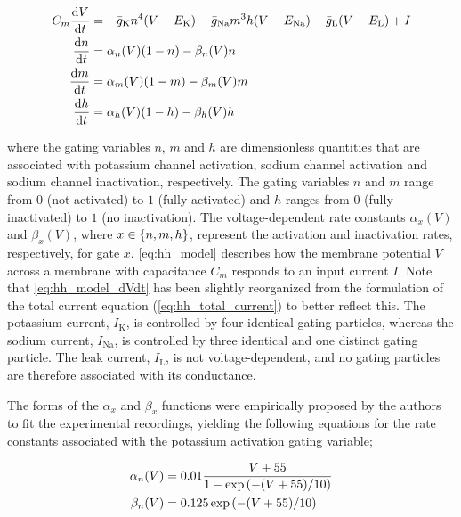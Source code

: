 \begin{subequations}\label{eq:hh_model}
    \begin{align}
    C_m \frac{\dd{V}}{\dd{t}} &= - \bar{g}_{\mathrm{K}} n^4 \qty(V - E_\mathrm{K}) - \bar{g}_{\mathrm{Na}} m^3h \qty(V - E_\mathrm{Na}) - \bar{g}_\mathrm{L} \qty(V - E_\mathrm{L}) + I
    \label{eq:hh_model_dVdt}
    \\
    \frac{\dd{n}}{\dd{t}} &= \alpha_n (V) (1-n) - \beta_n (V) n 
    \label{eq:hh_model_dndt}
    \\
    \frac{\dd{m}}{\dd{t}} &= \alpha_m (V) (1-m) - \beta_m (V) m
    \label{eq:hh_model_dmdt}
    \\
    \frac{\dd{h}}{\dd{t}} &= \alpha_h (V) (1-h) - \beta_h (V) h
    \label{eq:hh_model_dhdt}
    \end{align}
\end{subequations}

where the gating variables $n$, $m$ and $h$ are dimensionless quantities that are associated with potassium channel activation, sodium channel activation and sodium channel inactivation, respectively. The gating variables $n$ and $m$ range from $0$ (not activated) to $1$ (fully activated) and $h$ ranges from $0$ (fully inactivated) to $1$ (no inactivation). The voltage-dependent rate constants $\alpha_x (V)$ and $\beta_x(V)$, where $x \in \qty{n,m,h}$, represent the activation and inactivation rates, respectively, for gate $x$. \autoref{eq:hh_model} describes how the membrane potential $V$ across a membrane with capacitance $C_m$ responds to an input current $I$. Note that \autoref{eq:hh_model_dVdt} has been slightly reorganized from the formulation of the total current equation (\autoref{eq:hh_total_current}) to better reflect this. The potassium current, $I_\mathrm{K}$, is controlled by four identical gating particles, whereas the sodium current, $I_\mathrm{Na}$, is controlled by three identical and one distinct gating particle. The leak current, $I_\mathrm{L}$, is not voltage-dependent, and no gating particles are therefore associated with its conductance.

The forms of the $\alpha_x$ and $\beta_x$ functions were empirically proposed by the authors to fit the experimental recordings, yielding the following equations for the rate constants associated with the potassium activation gating variable;

\begin{subequations}
    \begin{align}
        \alpha_n (V) &= 0.01 \frac{V + 55}{1 - \exp \qty(-(V+55)/10)}
        \\
        \beta_n (V) &= 0.125 \exp \qty(-(V+55)/10)
    \end{align}
\end{subequations}


